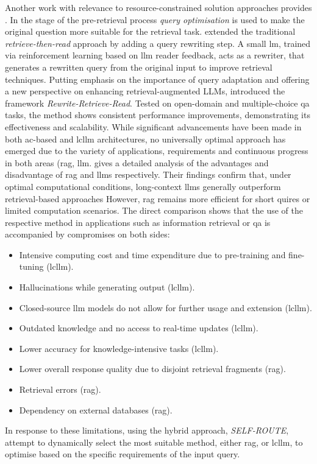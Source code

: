 %
Another work with relevance to resource-constrained solution approaches provides \citet{Ma2023QueryRF}.
In the stage of the pre-retrieval process \textit{query optimisation} is used to make the original question more suitable for the retrieval task.
\citet{Ma2023QueryRF} extended the traditional \textit{retrieve-then-read} approach by adding a query rewriting step.
A small \ac{lm}, trained via reinforcement learning based on \ac{llm} reader feedback, acts as a rewriter, that generates a rewritten query from the original input to improve retrieval techniques. 
Putting emphasis on the importance of query adaptation and offering a new perspective on enhancing retrieval-augmented LLMs, \citet{Ma2023QueryRF} introduced the framework \textit{Rewrite-Retrieve-Read}.
Tested on open-domain and multiple-choice \ac{qa} tasks, the method shows consistent performance improvements, demonstrating its effectiveness and scalability.
%
While significant advancements have been made in both \ac{ac}-based and \ac{lcllm} architectures, no universally optimal approach has emerged due to the variety of applications, requirements and continuous progress in both areas (\ac{rag, llm}. 
\citet{Li2024RetrievalAG} gives a detailed analysis of the advantages and disadvantage of \ac{rag} and \ac{llm}s respectively.
Their findings confirm that, under optimal computational conditions, long-context \ac{llm}s generally outperform retrieval-based approaches
However, \ac{rag} remains more efficient for short quires or limited computation scenarios.
The direct comparison shows that the use of the respective method in applications such as information retrieval or \ac{qa} is accompanied by compromises on both sides:
\begin{itemize}
    \item Intensive computing cost and time expenditure due to pre-training and fine-tuning (\ac{lcllm}).
    \item Hallucinations while generating output (\ac{lcllm}).
    \item Closed-source \ac{llm} models do not allow for further usage and extension (\ac{lcllm}).
    \item Outdated knowledge and no access to real-time updates (\ac{lcllm}).
    \item Lower accuracy for knowledge-intensive tasks (\ac{lcllm}).
    \item Lower overall response quality due to disjoint retrieval fragments (\ac{rag}).
    \item Retrieval errors (\ac{rag}).
    \item Dependency on external databases (\ac{rag}).
\end{itemize}
%
In response to these limitations, \citet{Li2024RetrievalAG} using the hybrid approach, \textit{SELF-ROUTE}, attempt to dynamically select the most suitable method, either \ac{rag}, or \ac{lcllm}, to optimise based on the specific requirements of the input query. 

